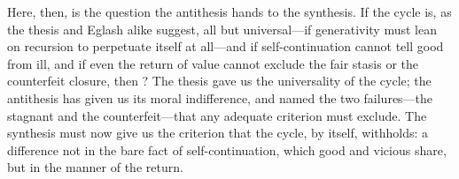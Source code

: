 Here, then, is the question the antithesis hands to the synthesis. If the cycle is, as the thesis and Eglash alike suggest, all but universal---if generativity must lean on recursion to perpetuate itself at all---and if self-continuation cannot tell good from ill, and if even the return of value cannot exclude the fair stasis or the counterfeit closure, then ? The thesis gave us the universality of the cycle; the antithesis has given us its moral indifference, and named the two failures---the stagnant and the counterfeit---that any adequate criterion must exclude. The synthesis must now give us the criterion that the cycle, by itself, withholds: a difference not in the bare fact of self-continuation, which good and vicious share, but in the manner of the return.
